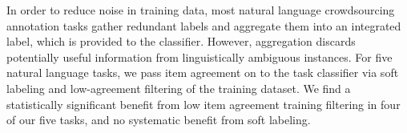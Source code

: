 In order to reduce noise in training data, most natural language crowdsourcing annotation tasks gather redundant labels and aggregate them into an integrated label, which is provided to the classifier. However, aggregation discards potentially useful information from linguistically ambiguous instances. For five natural language tasks, we pass item agreement on to the task classifier via soft labeling and low-agreement filtering of the training dataset. We find a statistically significant benefit from low item agreement training filtering in four of our five tasks, and no systematic benefit from soft labeling.
